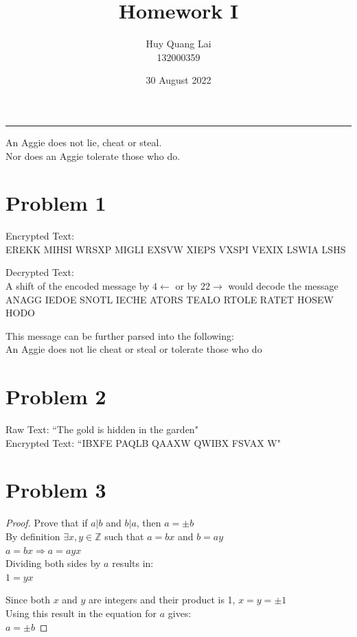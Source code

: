 \documentclass{article}
\title{\vspace{-2.5cm}Homework I}
\author{\vspace{-0.2cm} Huy Quang Lai\\132000359}
\affil{Texas A\&M University}
\date{\vspace{-0.5cm}30 August 2022}
\begin{document}
\maketitle
\begin{center}
\rule{\textwidth}{.1pt}
{\large
An Aggie does not lie, cheat or steal.\\
Nor does an Aggie tolerate those who do.
}
\end{center}

\section*{Problem 1}
Encrypted Text:\\
EREKK MIHSI WRSXP MIGLI EXSVW XIEPS VXSPI VEXIX LSWIA LSHS

\noindent
Decrypted Text:\\
A shift of the encoded message by $4\leftarrow$ or by $22\rightarrow$ would decode the message\\
ANAGG IEDOE SNOTL IECHE ATORS TEALO RTOLE RATET HOSEW HODO

\noindent
This message can be further parsed into the following:\\
An Aggie does not lie cheat or steal or tolerate those who do

\section*{Problem 2}
Raw Text: ``The gold is hidden in the garden"\\
Encrypted Text: ``IBXFE PAQLB QAAXW QWIBX FSVAX W"

\section*{Problem 3}
\begin{proof}
Prove that if $a|b$ and $b|a$, then $a=\pm b$\\
By definition $\exists x,y\in\mathbb{Z}$ such that $a=bx$ and $b=ay$\\
$a = bx \Rightarrow a = ayx$\\
Dividing both sides by $a$ results in:\\
$1 = yx$

\noindent
Since both $x$ and $y$ are integers and their product is 1, $x=y=\pm 1$\\
Using this result in the equation for $a$ gives:\\
$a=\pm b$
\end{proof}
\end{document}
